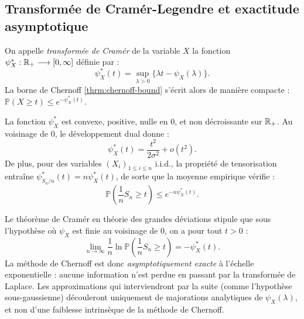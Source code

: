 \subsection{Transformée de Cramér-Legendre et exactitude asymptotique}

\begin{definition}
    On appelle \emph{transformée de Cramér} de la variable $X$ la fonction $\psi_X^* : \mathbb{R}_+ \longrightarrow [0, \infty]$ définie par :
    \begin{equation}
        \psi_X^*(t) = \sup_{\lambda > 0} \{ \lambda t - \psi_X(\lambda) \}.
    \end{equation}
    La borne de Chernoff \ref{thrm:chernoff-bound} s'écrit alors de manière compacte : $\mathbb{P}(X \geqslant t) \leqslant e^{-\psi_X^*(t)}$.
\end{definition}

\begin{prop}
    La fonction $\psi_X^*$ est convexe, positive, nulle en $0$, et non décroissante sur $\mathbb{R}_+$. Au voisinage de $0$, le développement dual donne :
    \begin{equation}
        \psi_X^*(t) = \frac{t^2}{2\sigma^2} + o(t^2).
    \end{equation}
    De plus, pour des variables $(X_i)_{1 \leqslant i \leqslant n}$ i.i.d., la propriété de tensorisation entraîne $\psi_{S_n/n}^*(t) = n \psi_X^*(t)$, de sorte que la moyenne empirique vérifie :
    \begin{equation}
        \mathbb{P}\left( \frac{1}{n} S_n \geqslant t \right) \leqslant e^{-n \psi_X^*(t)}.
    \end{equation}
\end{prop}

\begin{remark}
    Le théorème de Cramér en théorie des grandes déviations stipule que sous l'hypothèse où $\psi_X$ est finie au voisinage de $0$, on a pour tout $t > 0$ :
    \begin{equation}
        \lim_{n \to \infty} \frac{1}{n} \ln \mathbb{P}\left( \frac{1}{n} S_n \geqslant t \right) = - \psi_X^*(t).
    \end{equation}
    La méthode de Chernoff est donc \emph{asymptotiquement exacte} à l'échelle exponentielle : aucune information n'est perdue en passant par la transformée de Laplace. Les approximations qui interviendront par la suite (comme l'hypothèse sous-gaussienne) découleront uniquement de majorations analytiques de $\psi_X(\lambda)$, et non d'une faiblesse intrinsèque de la méthode de Chernoff.
\end{remark}


